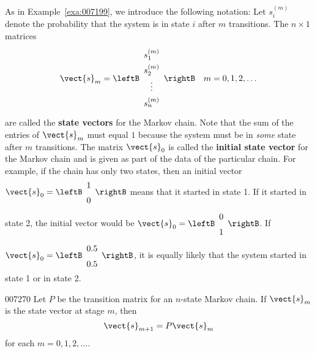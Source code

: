 As in Example~\ref{exa:007199}, we introduce the following notation: Let $s_{i}^{(m)}$ denote the probability that the system is in state $i$ after $m$ transitions. The $n \times 1$ matrices
\begin{equation*}
\vect{s}_m = \leftB \def\arraystretch{1.5}\begin{array}{c}
s_{1}^{(m)} \\
s_{2}^{(m)} \\
\vdots \\
s_{n}^{(m)} 
\end{array} \rightB \quad m = 0, 1, 2, \dots
\end{equation*}
are called the \textbf{state vectors} for the Markov chain. Note that the sum of the entries of $\vect{s}_{m}$ must equal $1$ because the system must be in \textit{some} state after $m$ transitions. The matrix $\vect{s}_{0}$ is called the \textbf{initial state vector} for the Markov chain and is given as part of the data of the particular chain. For example, if the chain has only two states, then an initial vector $\vect{s}_0 = \leftB \begin{array}{c}
1 \\
0
\end{array} \rightB$
 means that it started in state 1. If it started in state 2, the initial vector would be $\vect{s}_0 = \leftB \begin{array}{c}
 0 \\
 1
 \end{array} \rightB$.
 If $\vect{s}_0 = \leftB \begin{array}{c}
 0.5 \\
 0.5
 \end{array} \rightB$, it is equally likely that the system started in state 1 or in state 2.


\begin{theorem}{}{007270}
Let $P$ be the transition matrix for an $n$-state Markov chain. If $\vect{s}_{m}$ is the state vector at stage $m$, then
\begin{equation*}
\vect{s}_{m+1} = P\vect{s}_m
\end{equation*}
for each $m = 0, 1, 2, \dots$.
\end{theorem}

